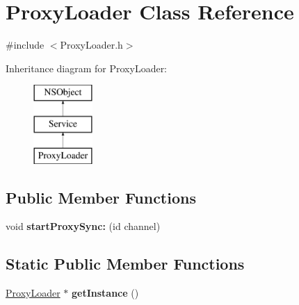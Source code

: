 \hypertarget{interface_proxy_loader}{
\section{\-Proxy\-Loader \-Class \-Reference}
\label{interface_proxy_loader}
}


{\ttfamily \#include $<$\-Proxy\-Loader.\-h$>$}

\-Inheritance diagram for \-Proxy\-Loader\-:\begin{figure}[H]
\begin{center}
\leavevmode
\includegraphics[height=3.000000cm]{interface_proxy_loader}
\end{center}
\end{figure}
\subsection*{\-Public \-Member \-Functions}
\begin{DoxyCompactItemize}
\item 
\hypertarget{interface_proxy_loader_a887d18db8b29241aa414a66df14c5f46}{
void {\bfseries start\-Proxy\-Sync\-:} (id channel)}
\label{interface_proxy_loader_a887d18db8b29241aa414a66df14c5f46}

\end{DoxyCompactItemize}
\subsection*{\-Static \-Public \-Member \-Functions}
\begin{DoxyCompactItemize}
\item 
\hypertarget{interface_proxy_loader_a8ed83d004fa4d99adae1dd7e8e653649}{
\hyperlink{interface_proxy_loader}{\-Proxy\-Loader} $\ast$ {\bfseries get\-Instance} ()}
\label{interface_proxy_loader_a8ed83d004fa4d99adae1dd7e8e653649}

\end{DoxyCompactItemize}


